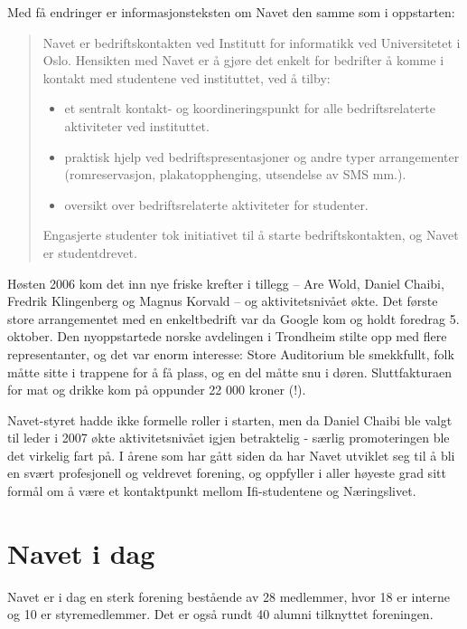 Med få endringer er informasjonsteksten om Navet den samme som i oppstarten:

\begin{quote}
	Navet er bedriftskontakten ved Institutt for informatikk ved Universitetet i Oslo. Hensikten med Navet er å gjøre det enkelt for bedrifter å komme i kontakt med studentene ved instituttet, ved å tilby:
	
	\begin{itemize}
		\item et sentralt kontakt- og koordineringspunkt for alle bedriftsrelaterte aktiviteter ved instituttet.
		\item praktisk hjelp ved bedriftspresentasjoner og andre typer arrangementer (romreservasjon, plakatopphenging, utsendelse av SMS mm.).
		\item oversikt over bedriftsrelaterte aktiviteter for studenter.
	\end{itemize}
	
	Engasjerte studenter tok initiativet til å starte bedriftskontakten, og Navet er studentdrevet.
\end{quote}

Høsten 2006 kom det inn nye friske krefter i tillegg -- Are Wold, Daniel Chaibi, Fredrik Klingenberg og Magnus Korvald -- og aktivitetsnivået økte. Det første store arrangementet med en enkeltbedrift var da Google kom og holdt foredrag 5. oktober. Den nyoppstartede norske avdelingen i Trondheim stilte opp med flere representanter, og det var enorm interesse: Store Auditorium ble smekkfullt, folk måtte sitte i trappene for å få plass, og en del måtte snu i døren. Sluttfakturaen for mat og drikke kom på oppunder 22 000 kroner (!).

Navet-styret hadde ikke formelle roller i starten, men da Daniel Chaibi ble valgt til leder i 2007 økte aktivitetsnivået igjen betraktelig - særlig promoteringen ble det virkelig fart på. I årene som har gått siden da har Navet utviklet seg til å bli en svært profesjonell og veldrevet forening, og oppfyller i aller høyeste grad sitt formål om å være et kontaktpunkt mellom Ifi-studentene og Næringslivet.

\section{Navet i dag}

\author{Skrevet av Carl-Magnus Lein, nåværende leder}

Navet er i dag en sterk forening bestående av 28 medlemmer, hvor 18 er interne og 10 er styremedlemmer. Det er også rundt 40 alumni tilknyttet foreningen.

